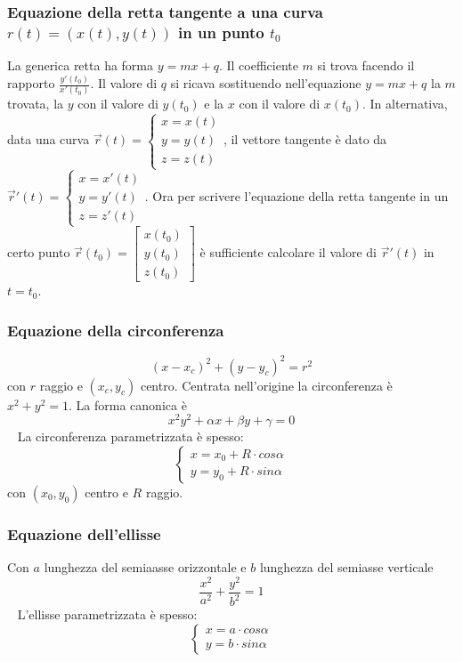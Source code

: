 \subsubsection{Equazione della retta tangente a una curva $r(t) = (x(t), y(t))$ in un punto $t_0$}
La generica retta ha forma $y = mx +q$. \newline
Il coefficiente $m$ si trova facendo il rapporto $\frac{y'(t_0)}{x'(t_0)}$.\newline
Il valore di $q$ si ricava sostituendo nell'equazione $y = mx +q$ la $m$ trovata, la $y$ con il valore di $y(t_0)$ e la $x$ con il valore di $x(t_0)$.
\newline
\newline
In alternativa, data una curva $\vec{r}(t) = \begin{cases}
    x = x(t)\\ y=y(t)\\ z = z(t)
\end{cases}$, il vettore tangente è dato da $\vec{r}'(t) = \begin{cases}
    x = x'(t)\\ y = y'(t) \\ z = z'(t)
\end{cases}$. Ora per scrivere l'equazione della retta tangente in un certo punto $\vec{r}(t_0) = \left[\begin{matrix}
    x(t_0)\\ y(t_0) \\ z(t_0)
\end{matrix}\right]$ è sufficiente calcolare il valore di $\vec{r}' (t)$ in $t = t_0$.
\subsubsection{Equazione della circonferenza}
\[
    (x-x_c)^2 + (y-y_c)^2 = r^2
\]
con $r$ raggio e $(x_c, y_c)$ centro. Centrata nell'origine la circonferenza è $x^2 + y^2 = 1$.\newline
\newline
La forma canonica è
\[
    x^2 y^2 + \alpha x + \beta y + \gamma = 0
\]
\ \newline
La circonferenza parametrizzata è spesso:
\[
    \begin{cases}
        x = x_0 + R \cdot  cos \alpha\\
        y = y_0 + R \cdot  sin \alpha
    \end{cases}
\]
con $(x_0,y_0)$ centro e $R$ raggio.
\subsubsection{Equazione dell'ellisse}
Con $a$ lunghezza del semiaasse orizzontale e $b$ lunghezza del semiasse verticale
\[
    \frac{x^2}{a^2} + \frac{y^2}{b^2} = 1
\]
\ \newline
L'ellisse parametrizzata è spesso:
\[
    \begin{cases}
        x = a \cdot  cos \alpha\\
        y = b \cdot  sin \alpha
    \end{cases}
\]
